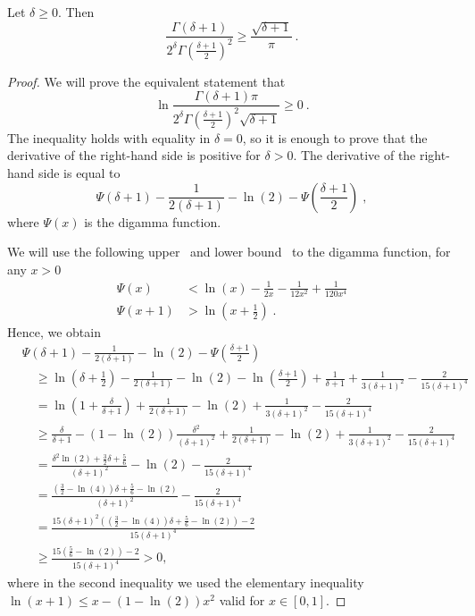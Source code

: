 \begin{lemma}
\label{lemma:ratio_gamma}
Let $\delta \geq 0$. Then
\[
\frac{\Gamma(\delta+1)}{2^\delta \Gamma(\frac{\delta+1}{2})^2}
\geq \frac{\sqrt{\delta+1}}{\pi}~.
\]
\end{lemma}
%
\begin{proof}
We will prove the equivalent statement that
\[
\ln \frac{\Gamma(\delta+1) \pi}{2^\delta \Gamma(\frac{\delta+1}{2})^2 \sqrt{\delta+1}} \geq 0~.
\]
The inequality holds with equality in $\delta=0$, so it is enough to prove that
the derivative of the right-hand side is positive for $\delta > 0$. The
derivative of the right-hand side is equal to
$$
\Psi(\delta+1) - \frac{1}{2(\delta+1)} -\ln(2) - \Psi\left(\frac{\delta+1}{2} \right) \; ,
$$
where $\Psi(x)$ is the digamma function.

We will use the following upper~\citep{Chen05} and lower bound~\citep{Batir08} to the digamma function, for any $x>0$
\begin{align*}
\Psi(x) &< \ln(x) -\frac{1}{2x} -\frac{1}{12 x^2} +\frac{1}{120 x^4}\\
\Psi(x+1) &> \ln \left(x+\frac{1}{2} \right) \; .
\end{align*}
Hence, we obtain
\begin{align*}
&\Psi(\delta+1) - \frac{1}{2(\delta+1)} - \ln(2) - \Psi \left(\frac{\delta+1}{2} \right) \\
&\quad \ge \ln \left(\delta+\frac{1}{2} \right) - \frac{1}{2(\delta+1)} -\ln(2) -\ln \left(\frac{\delta+1}{2}\right) + \frac{1}{\delta+1} +\frac{1}{3 (\delta+1)^2} -\frac{2}{15 (\delta+1)^4}\\
&\quad = \ln \left(1+\frac{\delta}{\delta+1} \right)+ \frac{1}{2(\delta+1)} -\ln(2)+\frac{1}{3 (\delta+1)^2} -\frac{2}{15 (\delta+1)^4}\\
&\quad \ge \frac{\delta}{\delta+1} - (1-\ln(2))\frac{\delta^2}{(\delta+1)^2}+ \frac{1}{2(\delta+1)} -\ln(2)+\frac{1}{3 (\delta+1)^2}-\frac{2}{15 (\delta+1)^4}\\
&\quad = \frac{\delta^2 \ln(2)+\frac{3}{2}\delta +\frac{5}{6}}{(\delta+1)^2} - \ln(2)-\frac{2}{15 (\delta+1)^4}\\
&\quad = \frac{(\frac{3}{2}-\ln(4)) \delta +\frac{5}{6}-\ln(2)}{(\delta+1)^2} -\frac{2}{15 (\delta+1)^4} \\
&\quad = \frac{15 (\delta+1)^2 \left((\frac{3}{2}-\ln(4)) \delta +\frac{5}{6}-\ln(2)\right)-2}{15(\delta+1)^4} \\
&\quad \geq \frac{15 \left(\frac{5}{6}-\ln(2)\right)-2}{15(\delta+1)^4} >0,
\end{align*}
where in the second inequality we used the elementary inequality $\ln(x+1) \leq x - (1-\ln(2))x^2$ valid for $x \in [0,1]$.
\end{proof}

